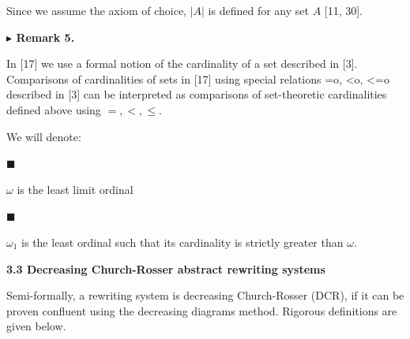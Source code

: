  
Since we assume the axiom of choice, $|A|$ is defined for any set $A$ [11, 30].\par
 
 
 
 
\par\medskip\noindent\textbf{$\blacktriangleright$ Remark 5.}\par
 
 
In [17] we use a formal notion of the cardinality of a set described in [3]. Comparisons of cardinalities of sets in [17] using special relations =o, <o, <=o described in [3] can be interpreted as comparisons of set-theoretic cardinalities defined above using $=,<,\leq$.\par
 
 
 
 
We will denote:\par
  
\par\noindent  $\blacksquare$ 
 
$\omega$ is the least limit ordinal\par
 
 
 
\par\noindent  $\blacksquare$ 
 
$\omega_{1}$ is the least ordinal such that its cardinality is strictly greater than $\omega$.\par
 
 
  
 
 
 
\par\medskip\noindent\textbf{3.3 Decreasing Church-Rosser abstract rewriting systems}\par
 
 
Semi-formally, a rewriting system is decreasing Church-Rosser (DCR), if it can be proven confluent using the decreasing diagrams method. Rigorous definitions are given below.\par
 
